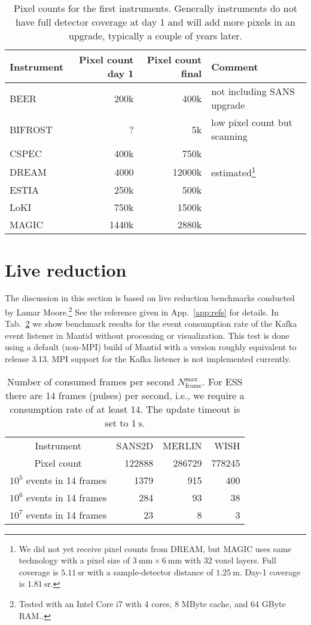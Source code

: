 \documentclass[a4paper,english,numbers=noenddot,bibliography=totoc,chapterprefix=on,DIV=12]{scrartcl}
\newcommand{\beer}{BEER\xspace}
\newcommand{\bifrost}{BIFROST\xspace}
\newcommand{\cspec}{CSPEC\xspace}
\newcommand{\dream}{DREAM\xspace}
\newcommand{\estia}{ESTIA\xspace}
\newcommand{\loki}{LoKI\xspace}
\newcommand{\magic}{MAGIC\xspace}
\newcommand{\mantid}{Mantid\xspace}
\begin{document}
\begin{table}
  \centering
  \begin{tabular}{lrrl}
    Instrument & Pixel count day 1 & Pixel count final & Comment\\
    \hline
    \beer & 200k & 400k & not including SANS upgrade\\
    \bifrost & ? & 5k & low pixel count but scanning\\
    \cspec & 400k & 750k \\
    \dream & 4000 & 12000k & estimated\footnote{We did not yet receive pixel counts from DREAM, but MAGIC uses same technology with a pixel size of $3~\mathrm{mm} \times 6~\mathrm{mm}$ with 32 voxel layers. Full coverage is $5.11~\mathrm{sr}$ with a sample-detector distance of $1.25~\mathrm{m}$. Day-1 coverage is $1.81~\mathrm{sr}$.}\\
    \estia & 250k & 500k \\
    \loki & 750k & 1500k \\
    \magic & 1440k & 2880k \\
  \end{tabular}
  \caption{\label{tab:pixel-counts}Pixel counts for the first instruments. Generally instruments do not have full detector coverage at day 1 and will add more pixels in an upgrade, typically a couple of years later.}
\end{table}




\section{Live reduction}

The discussion in this section is based on live reduction benchmarks conducted by Lamar Moore.\footnote{Tested with an Intel Core i7 with 4 cores, 8 MByte cache, and 64 GByte RAM..}
See the reference given in App.~\ref{app:refs} for details.
In Tab.~\ref{tab:consumption-rate} we show benchmark results for the event consumption rate of the Kafka event listener in \mantid without processing or visualization.
This test is done using a default (non-MPI) build of \mantid with a version roughly equivalent to release 3.13.
MPI support for the Kafka listener is not implemented currently.

\begin{table}
  \centering
  \begin{tabular}{c|rrr}
    Instrument & SANS2D & MERLIN & WISH\\
    Pixel count & 122888 & 286729 & 778245\\
    \hline
    $10^5$ events in 14 frames & 1379 & 915 & 400 \\
    $10^6$ events in 14 frames & 284 & 93 & 38 \\
    $10^7$ events in 14 frames & 23 & 8 & 3 \\
  \end{tabular}
  \caption{\label{tab:consumption-rate}Number of consumed frames per second $N_{\text{frame}}^{\text{max}}$. For ESS there are 14 frames (pulses) per second, i.e., we require a consumption rate of at least 14. The update timeout is set to $1~\mathrm{s}$.}
\end{table}
\end{document}
